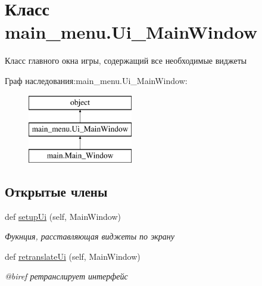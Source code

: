 \hypertarget{classmain__menu_1_1_ui___main_window}{}\section{Класс main\+\_\+menu.\+Ui\+\_\+\+Main\+Window}
\label{classmain__menu_1_1_ui___main_window}


Класс главного окна игры, содержащий все необходимые виджеты  


Граф наследования\+:main\+\_\+menu.\+Ui\+\_\+\+Main\+Window\+:\begin{figure}[H]
\begin{center}
\leavevmode
\includegraphics[height=3.000000cm]{classmain__menu_1_1_ui___main_window}
\end{center}
\end{figure}
\subsection*{Открытые члены}
\begin{DoxyCompactItemize}
\item 
def \mbox{\hyperlink{classmain__menu_1_1_ui___main_window_ab775fda9b5e9b5999364c44f335bc148}{setup\+Ui}} (self, Main\+Window)
\begin{DoxyCompactList}\small\item\em Фукнция, расставляющая виджеты по экрану \end{DoxyCompactList}\item 
def \mbox{\hyperlink{classmain__menu_1_1_ui___main_window_afc5b3b59947cb086923048a8fda86243}{retranslate\+Ui}} (self, Main\+Window)
\begin{DoxyCompactList}\small\item\em @biref ретранслирует интерфейс \end{DoxyCompactList}\end{DoxyCompactItemize}
